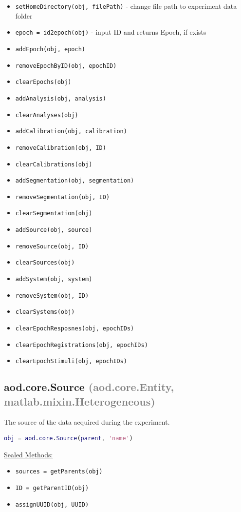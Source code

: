 \documentclass[10pt]{exam}
\newcommand\myparent[1]{\textcolor{gray}{(#1)}}
\newcommand\aodfcn[1]{\textcolor{darkteal}{\texttt{#1}}}
\newcommand\docheader[1]{\vspace{0.6ex}\noindent\underline{#1}\vspace{0.15ex}}
\begin{document}
		\begin{itemize}
			\item \aodfcn{setHomeDirectory(obj, filePath)} - change file path to experiment data folder
			\item \aodfcn{epoch = id2epoch(obj)} - input ID and returns Epoch, if exists\\
			\item \aodfcn{addEpoch(obj, epoch)}
			\item \aodfcn{removeEpochByID(obj, epochID)}
			\item \aodfcn{clearEpochs(obj)}\\
			\item \aodfcn{addAnalysis(obj, analysis)}
			\item \aodfcn{clearAnalyses(obj)}
			\item \aodfcn{addCalibration(obj, calibration)}
			\item \aodfcn{removeCalibration(obj, ID)}
			\item \aodfcn{clearCalibrations(obj)}\\
			\item \aodfcn{addSegmentation(obj, segmentation)}
			\item \aodfcn{removeSegmentation(obj, ID)}
			\item \aodfcn{clearSegmentation(obj)}\\
			\item \aodfcn{addSource(obj, source)}
			\item \aodfcn{removeSource(obj, ID)}
			\item \aodfcn{clearSources(obj)}\\
			\item \aodfcn{addSystem(obj, system)}
			\item \aodfcn{removeSystem(obj, ID)}
			\item \aodfcn{clearSystems(obj)}\\
			\item \aodfcn{clearEpochResposnes(obj, epochIDs)}
			\item \aodfcn{clearEpochRegistrations(obj, epochIDs)}
			\item \aodfcn{clearEpochStimuli(obj, epochIDs)}
		\end{itemize}
	\subsection{aod.core.Source \myparent{aod.core.Entity, matlab.mixin.Heterogeneous}}
		\label{subsection:aod.core.Source}
		\noindent The source of the data acquired during the experiment. 
		\begin{lstlisting}[language=matlab]
obj = aod.core.Source(parent, 'name')
		\end{lstlisting}
		\docheader{Sealed Methods:}
		\begin{itemize}
			\item \aodfcn{sources = getParents(obj)}
			\item \aodfcn{ID = getParentID(obj)}
			\item \aodfcn{assignUUID(obj, UUID)}
		\end{itemize}
\end{document}
